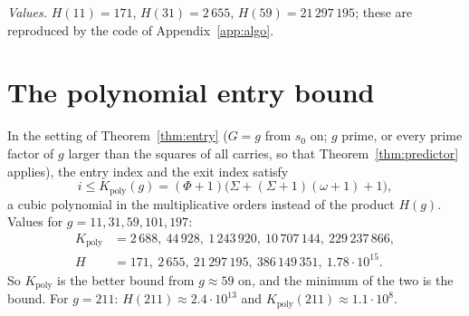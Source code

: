 \emph{Values.} \(H(11)=171\), \(H(31)=2\,655\), \(H(59)=21\,297\,195\); these are reproduced by the code of Appendix~\ref{app:algo}.

\section{The polynomial entry bound}

\begin{theorem}\label{thm:Kpoly}
In the setting of Theorem~\ref{thm:entry} (\(G=g\) from \(s_0\) on; \(g\) prime, or every prime factor of \(g\) larger than the squares of all carries, so that Theorem~\ref{thm:predictor} applies), the entry index and the exit index satisfy
\[
i\le K_{\mathrm{poly}}(g)=(\Phi+1)\big(\Sigma+(\Sigma+1)(\omega+1)+1\big),
\]
a cubic polynomial in the multiplicative orders instead of the product \(H(g)\). Values for \(g=11,31,59,101,197\):
\begin{align*}
K_{\mathrm{poly}}&=2\,688,\ 44\,928,\ 1\,243\,920,\ 10\,707\,144,\ 229\,237\,866,\\
H&=171,\ 2\,655,\ 21\,297\,195,\ 386\,149\,351,\ 1.78\cdot10^{15}.
\end{align*}
So \(K_{\mathrm{poly}}\) is the better bound from \(g\approx59\) on, and the minimum of the two is the bound. For \(g=211\): \(H(211)\approx2.4\cdot10^{13}\) and \(K_{\mathrm{poly}}(211)\approx1.1\cdot10^8\).
\end{theorem}
